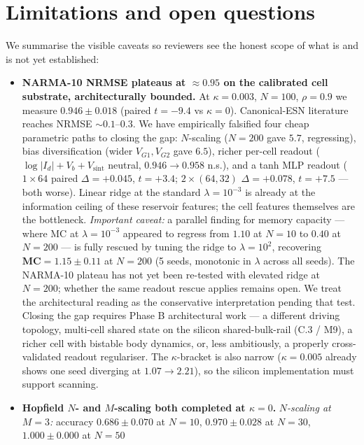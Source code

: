 \documentclass[fontsize=10pt]{article}
\begin{document}
\section{Limitations and open questions}
We summarise the visible caveats so reviewers see the honest scope of what is
and is not yet established:
\begin{itemize}\setlength{\itemsep}{1pt}
  \item \textbf{NARMA-10 NRMSE plateaus at $\approx 0.95$ on the
    calibrated cell substrate, architecturally bounded.} At $\kappa=0.003$,
    $N=100$, $\rho=0.9$ we measure $0.946 \pm 0.018$ (paired $t=-9.4$ vs
    $\kappa=0$). Canonical-ESN literature reaches NRMSE $\sim 0.1$--$0.3$.
    We have empirically falsified four cheap parametric paths to closing
    the gap: $N$-scaling ($N=200$ gave $5.7$, regressing), bias
    diversification (wider $V_{G1}, V_{G2}$ gave $6.5$), richer per-cell
    readout ($\log|I_d|+V_b+V_{\mathrm{sint}}$ neutral, $0.946 \to 0.958$
    n.s.), and a tanh MLP readout ($1{\times}64$ paired $\Delta=+0.045$,
    $t=+3.4$; $2{\times}(64,32)$ $\Delta=+0.078$, $t=+7.5$ --- both worse).
    Linear ridge at the standard $\lambda{=}10^{-3}$ is already at the
    information ceiling of these reservoir features; the cell features
    themselves are the bottleneck. \emph{Important caveat:} a parallel
    finding for memory capacity --- where MC at $\lambda{=}10^{-3}$
    appeared to regress from $1.10$ at $N{=}10$ to $0.40$ at $N{=}200$ ---
    is fully rescued by tuning the ridge to $\lambda{=}10^{2}$,
    recovering $\mathbf{MC} = 1.15 \pm 0.11$ at $N{=}200$
    (5 seeds, monotonic in $\lambda$ across all seeds). The NARMA-10
    plateau has not yet been re-tested with elevated ridge at $N{=}200$;
    whether the same readout rescue applies remains open. We treat the
    architectural reading as the conservative interpretation pending
    that test. Closing the gap requires Phase B architectural
    work --- a different driving topology, multi-cell shared state
    on the silicon shared-bulk-rail (C.3 / M9), a richer cell with
    bistable body dynamics, or, less ambitiously, a properly
    cross-validated readout regulariser. The $\kappa$-bracket is also
    narrow ($\kappa=0.005$ already shows one seed diverging at
    $1.07 \to 2.21$), so the silicon implementation must support
    scanning.
  \item \textbf{Hopfield $N$- and $M$-scaling both completed at $\kappa=0$.}
    \emph{$N$-scaling at $M=3$:} accuracy $0.686 \pm 0.070$ at $N=10$,
    $0.970 \pm 0.028$ at $N=30$, $\mathbf{1.000 \pm 0.000}$ at $N=50$

\end{itemize}
\end{document}
